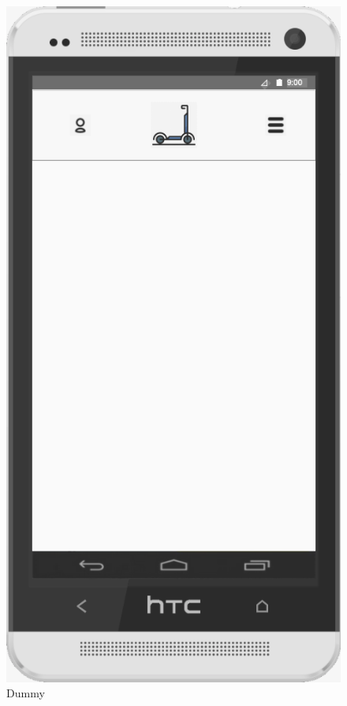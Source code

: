 \documentclass[a4paper, 12pt]{article}
\begin{document}
\begin{figure} [htbp]
  \begin{center}
    \includegraphics[scale=0.6]{01-dummy.png}
  \end{center}
  \caption{Dummy}
\end{figure}
\end{document}
